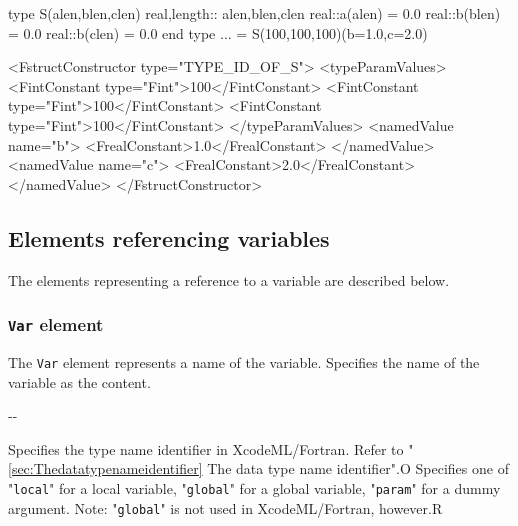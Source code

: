 \begin{Fexample2008}
type S(alen,blen,clen)
real,length:: alen,blen,clen
real::a(alen) = 0.0
real::b(blen) = 0.0
real::b(clen) = 0.0
end type
... = S(100,100,100)(b=1.0,c=2.0)
\end{Fexample2008}
\vspace{1mm}

\begin{XcodeMLFExample}
<FstructConstructor type="TYPE_ID_OF_S">
<typeParamValues>
  <FintConstant type="Fint">100</FintConstant>
<FintConstant type="Fint">100</FintConstant>
<FintConstant type="Fint">100</FintConstant>
  </typeParamValues>
  <namedValue name="b">
     <FrealConstant>1.0</FrealConstant>
  </namedValue>
  <namedValue name="c">
     <FrealConstant>2.0</FrealConstant>
  </namedValue>
</FstructConstructor>
\end{XcodeMLFExample}


\subsection{Elements referencing variables}

The elements representing a reference to a variable are described below.

\subsubsection{ {\tt Var} element}

The {\tt Var} element represents a name of the variable.
Specifies the name of the variable as the content.


\begin{XcodeMLChildElements}
\XcodeMLElementDef{-}
{-}{-}
\end{XcodeMLChildElements}

\begin{XcodeMLAttributes}
{Specifies the type name identifier in XcodeML/Fortran.
 Refer to "\ref{sec:Thedatatypenameidentifier} The data type name identifier".}{O}
{Specifies one of
\newline
"{\tt local}" for a local variable,
\newline
"{\tt global}" for a global variable,
\newline
"{\tt param}" for a dummy argument.
\newline
Note: "{\tt global}" is not used in XcodeML/Fortran, however.}{R}
\end{XcodeMLAttributes}


